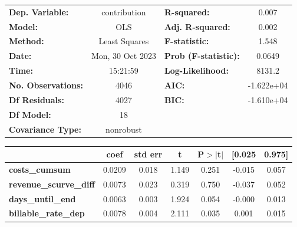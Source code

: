\begin{center}
\begin{tabular}{lclc}
\toprule
\textbf{Dep. Variable:}                     &   contribution   & \textbf{  R-squared:         } &     0.007   \\
\textbf{Model:}                             &       OLS        & \textbf{  Adj. R-squared:    } &     0.002   \\
\textbf{Method:}                            &  Least Squares   & \textbf{  F-statistic:       } &     1.548   \\
\textbf{Date:}                              & Mon, 30 Oct 2023 & \textbf{  Prob (F-statistic):} &   0.0649    \\
\textbf{Time:}                              &     15:21:59     & \textbf{  Log-Likelihood:    } &    8131.2   \\
\textbf{No. Observations:}                  &        4046      & \textbf{  AIC:               } & -1.622e+04  \\
\textbf{Df Residuals:}                      &        4027      & \textbf{  BIC:               } & -1.610e+04  \\
\textbf{Df Model:}                          &          18      & \textbf{                     } &             \\
\textbf{Covariance Type:}                   &    nonrobust     & \textbf{                     } &             \\
\bottomrule
\end{tabular}
\begin{tabular}{lcccccc}
                                            & \textbf{coef} & \textbf{std err} & \textbf{t} & \textbf{P$> |$t$|$} & \textbf{[0.025} & \textbf{0.975]}  \\
\midrule
\textbf{costs\_cumsum}                      &       0.0209  &        0.018     &     1.149  &         0.251        &       -0.015    &        0.057     \\
\textbf{revenue\_scurve\_diff}              &       0.0073  &        0.023     &     0.319  &         0.750        &       -0.037    &        0.052     \\
\textbf{days\_until\_end}                   &       0.0063  &        0.003     &     1.924  &         0.054        &       -0.000    &        0.013     \\
\textbf{billable\_rate\_dep}                &       0.0078  &        0.004     &     2.111  &         0.035        &        0.001    &        0.015     \\

\end{tabular}
\end{center}

